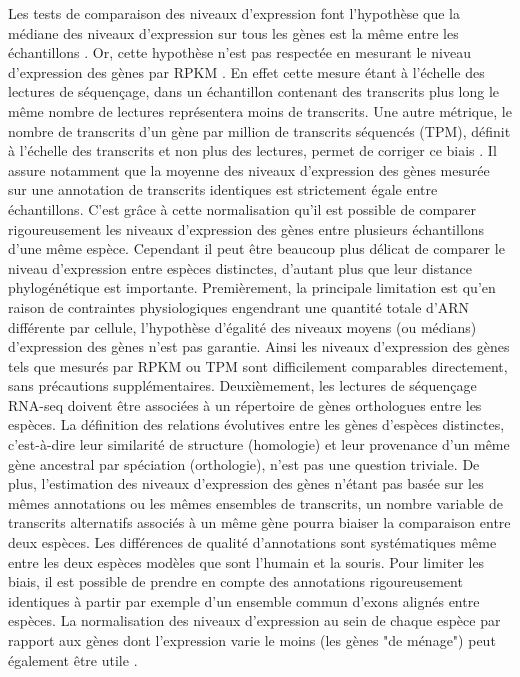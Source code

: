 Les tests de comparaison des niveaux d’expression font l’hypothèse que la médiane des niveaux d’expression sur tous les gènes est la même entre les échantillons \citep{robinson_edger_2010, love_moderated_2014}. Or, cette hypothèse n’est pas respectée en mesurant le niveau d’expression des gènes par \acrshort{RPKM} \citep{wagner_measurement_2012}. En effet cette mesure étant à l’échelle des lectures de séquençage, dans un échantillon contenant des transcrits plus long le même nombre de lectures représentera moins de transcrits. Une autre métrique, le nombre de transcrits d’un gène par million de transcrits séquencés (TPM), définit à l’échelle des transcrits et non plus des lectures, permet de corriger ce biais \citep{wagner_measurement_2012}. Il assure notamment que la moyenne des niveaux d’expression des gènes mesurée sur une annotation de transcrits identiques est strictement égale entre échantillons. C’est grâce à cette normalisation qu’il est possible de comparer rigoureusement les niveaux d’expression des gènes entre plusieurs échantillons d’une même espèce. Cependant il peut être beaucoup plus délicat de comparer le niveau d’expression entre espèces distinctes, d’autant plus que leur distance phylogénétique est importante. Premièrement, la principale limitation est qu’en raison de contraintes physiologiques engendrant une quantité totale d’\acrshort{ARN} différente par cellule, l’hypothèse d’égalité des niveaux moyens (ou médians) d’expression des gènes n’est pas garantie. Ainsi les niveaux d’expression des gènes tels que mesurés par \acrshort{RPKM} ou TPM sont difficilement comparables directement, sans précautions supplémentaires. Deuxièmement, les lectures de séquençage \acrshort{RNA-seq} doivent être associées à un répertoire de gènes orthologues entre les espèces. La définition des relations évolutives entre les gènes d’espèces distinctes, c'est-à-dire leur similarité de structure (homologie) et leur provenance d’un même gène ancestral par spéciation (orthologie), n’est pas une question triviale. De plus, l'estimation des niveaux d'expression des gènes n’étant pas basée sur les mêmes annotations ou les mêmes ensembles de transcrits, un nombre variable de transcrits alternatifs associés à un même gène pourra biaiser la comparaison entre deux espèces. Les différences de qualité d'annotations sont systématiques même entre les deux espèces modèles que sont l’humain et la souris. Pour limiter les biais, il est possible de prendre en compte des annotations rigoureusement identiques à partir par exemple d’un ensemble commun d’exons alignés entre espèces. La normalisation des niveaux d’expression au sein de chaque espèce par rapport aux gènes dont l’expression varie le moins (les gènes "de ménage") peut également être utile \citep{brawand_evolution_2011}.

